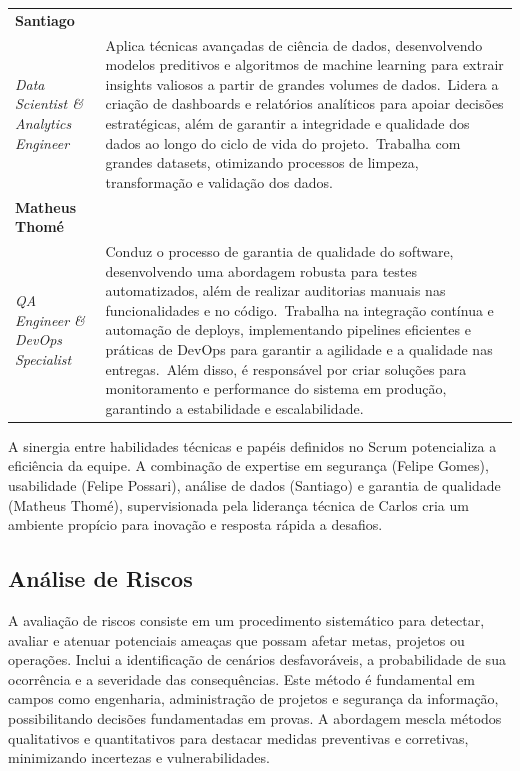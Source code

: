 \documentclass[a4paper, 12pt]{article}
\begin{document}
\begin{longtable}[c]{@{} >{\raggedright\arraybackslash}p{4.5cm} >{\raggedright\arraybackslash}p{11cm} @{}}
\textbf{Santiago} \\ \textit{Data Scientist \& Analytics Engineer} &
  Aplica técnicas avançadas de ciência de dados, desenvolvendo modelos preditivos e algoritmos de machine learning para extrair insights valiosos a partir de grandes volumes de dados.\
  Lidera a criação de dashboards e relatórios analíticos para apoiar decisões estratégicas, além de garantir a integridade e qualidade dos dados ao longo do ciclo de vida do projeto.\
  Trabalha com grandes datasets, otimizando processos de limpeza, transformação e validação dos dados. \\

\textbf{Matheus Thomé} \\ \textit{QA Engineer \& DevOps Specialist} &
  Conduz o processo de garantia de qualidade do software, desenvolvendo uma abordagem robusta para testes automatizados, além de realizar auditorias manuais nas funcionalidades e no código.\
  Trabalha na integração contínua e automação de deploys, implementando pipelines eficientes e práticas de DevOps para garantir a agilidade e a qualidade nas entregas.\
  Além disso, é responsável por criar soluções para monitoramento e performance do sistema em produção, garantindo a estabilidade e escalabilidade. \\

\end{longtable}

A sinergia entre habilidades técnicas e papéis definidos no Scrum potencializa a eficiência da equipe. A combinação de expertise em segurança (Felipe Gomes), usabilidade (Felipe Possari), análise de dados (Santiago) e garantia de qualidade (Matheus Thomé), supervisionada pela liderança técnica de Carlos cria um ambiente propício para inovação e resposta rápida a desafios.


\subsection{Análise de Riscos}

A avaliação de riscos consiste em um procedimento sistemático para detectar, avaliar e atenuar potenciais ameaças que possam afetar metas, projetos ou operações. Inclui a identificação de cenários desfavoráveis, a probabilidade de sua ocorrência e a severidade das consequências. Este método é fundamental em campos como engenharia, administração de projetos e segurança da informação, possibilitando decisões fundamentadas em provas. A abordagem mescla métodos qualitativos e quantitativos para destacar medidas preventivas e corretivas, minimizando incertezas e vulnerabilidades.
\end{document}
